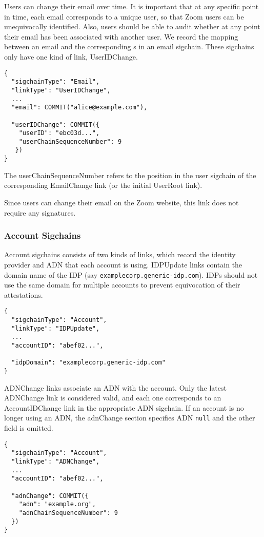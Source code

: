 Users can change their email over time. It is important that at any specific point in time, each
email corresponds to a unique user, so that Zoom users can be unequivocally identified. Also, users
should be able to audit whether at any point their email has been associated with another user. We
record the mapping between an email and the corresponding {\userID}s in an email sigchain. These
sigchains only have one kind of link, \textsf{UserIDChange}.

\begin{Verbatim}
{
  "sigchainType": "Email",
  "linkType": "UserIDChange",
  ...
  "email": COMMIT("alice@example.com"),

  "userIDChange": COMMIT({
    "userID": "ebc03d...",
    "userChainSequenceNumber": 9
   })
}
\end{Verbatim}

The \textsf{userChainSequenceNumber} refers to the position in the user sigchain of the
corresponding \textsf{EmailChange} link (or the initial \textsf{UserRoot} link).

Since users can change their email on the Zoom website, this link does not require any signatures.

\subsubsection{Account Sigchains}

Account sigchains consists of two kinds of links, which record the identity provider and ADN that
each account is using. \textsf{IDPUpdate} links contain the domain name of the IDP (say
\texttt{examplecorp.generic-idp.com}). IDPs should not use the same domain for multiple accounts
to prevent equivocation of their attestations.

\begin{Verbatim}
{
  "sigchainType": "Account",
  "linkType": "IDPUpdate",
  ...
  "accountID": "abef02...",

  "idpDomain": "examplecorp.generic-idp.com"
}
\end{Verbatim}

\textsf{ADNChange} links associate an ADN with the account. Only the latest \textsf{ADNChange} link
is considered valid, and each one corresponds to an \textsf{AccountIDChange} link in the appropriate
ADN sigchain. If an account is no longer using an ADN, the \textsf{adnChange} section specifies ADN
\texttt{null} and the other field is omitted.

\begin{Verbatim}
{
  "sigchainType": "Account",
  "linkType": "ADNChange",
  ...
  "accountID": "abef02...",

  "adnChange": COMMIT({
    "adn": "example.org",
    "adnChainSequenceNumber": 9
  })
}
\end{Verbatim}

